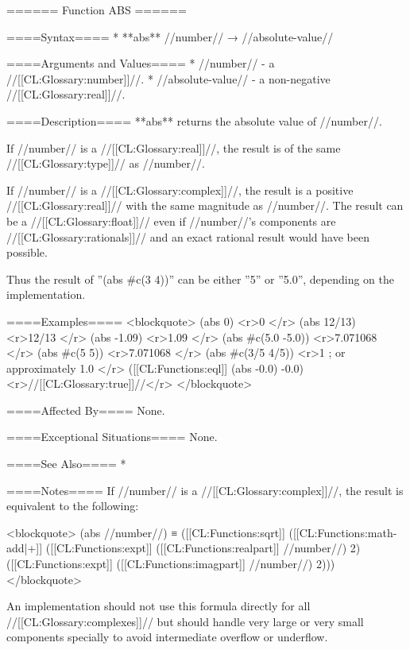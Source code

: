 ====== Function ABS ======

====Syntax====
  * **abs** //number// → //absolute-value//

====Arguments and Values====
  * //number// - a //[[CL:Glossary:number]]//.
  * //absolute-value// - a non-negative //[[CL:Glossary:real]]//.

====Description====
**abs** returns the absolute value of //number//.

If //number// is a //[[CL:Glossary:real]]//, the result is of the same //[[CL:Glossary:type]]// as //number//.

If //number// is a //[[CL:Glossary:complex]]//, the result is a positive //[[CL:Glossary:real]]// with the same magnitude as //number//. The result can be a //[[CL:Glossary:float]]// even if //number//'s components are //[[CL:Glossary:rationals]]// and an exact rational result would have been possible.

Thus the result of ''(abs #c(3 4))'' can be either ''5'' or ''5.0'', depending on the implementation.

====Examples====
<blockquote> 
(abs 0) <r>0 </r>
(abs 12/13) <r>12/13 </r>
(abs -1.09) <r>1.09 </r>
(abs #c(5.0 -5.0)) <r>7.071068 </r>
(abs #c(5 5)) <r>7.071068 </r>
(abs #c(3/5 4/5)) <r>1 ; or approximately 1.0 </r>
([[CL:Functions:eql]] (abs -0.0) -0.0) <r>//[[CL:Glossary:true]]//</r>
</blockquote>

====Affected By====
None.

====Exceptional Situations====
None.

====See Also====
  * {\secref\FloatSubstitutability}

====Notes====
If //number// is a //[[CL:Glossary:complex]]//, the result is equivalent to the following:

<blockquote>
(abs //number//) ≡ ([[CL:Functions:sqrt]] ([[CL:Functions:math-add|+]] ([[CL:Functions:expt]] ([[CL:Functions:realpart]] //number//) 2) ([[CL:Functions:expt]] ([[CL:Functions:imagpart]] //number//) 2)))
</blockquote>

An implementation should not use this formula directly for all //[[CL:Glossary:complexes]]// but should handle very large or very small components specially to avoid intermediate overflow or underflow.

  
